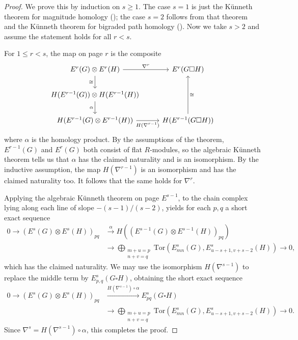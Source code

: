 \documentclass[a4paper, 11 pt, oneside, reqno]{amsart}
\numberwithin{lemma}{section}
\theoremstyle{definition}
\newcommand{\xto}{\xrightarrow}
\newcommand{\MPSS}{E}
\begin{document}
\begin{proof}
    We prove this by induction on \(s\geq 1\). The case \(s=1\) is just the K\"unneth theorem for magnitude homology (); the case \(s=2\) follows from that theorem and the K\"unneth theorem for bigraded path homology (). Now we take \(s > 2\) and assume the statement holds for all \(r < s\).
    
    For \(1 \leq r < s\), the map on page \(r\) is the composite
    \[
        \begin{tikzcd}
        [
        ar symbol/.style = {draw=none,"\textstyle#1" description,sloped},
        isomorphic/.style = {ar symbol={\cong}},
        ]
        \MPSS^r(G) \otimes \MPSS^r(H) \arrow[swap]{d}{\cong} \arrow{r}{\nabla^r} & \MPSS^r(G \square H)\\
        H(\MPSS^{r-1}(G)) \otimes H(\MPSS^{r-1}(H)) \arrow[swap]{d}{\alpha} \\
        H(\MPSS^{r-1}(G) \otimes \MPSS^{r-1}(H)) \arrow[swap]{r}{H(\nabla^{r-1})} & H(\MPSS^{r-1}(G \square H)) 
        \arrow[swap]{uu}{\cong}
        \end{tikzcd}
    \]
    where \(\alpha\) is the homology product. By the assumptions of the theorem, \(\MPSS^{r-1}(G)\) and \(\MPSS^r(G)\) both consist of flat \(R\)-modules, so the algebraic K\"unneth theorem tells us that \(\alpha\) has the claimed naturality and is an isomorphism. By the inductive assumption, the map \(H(\nabla^{r-1})\) is an isomorphism and has the claimed naturality too. It follows that the same holds for \(\nabla^r\).
    
    Applying the algebraic K\"unneth theorem on page \(E^{s-1}\), to the chain complex lying along each line of slope \(-(s-1) / (s-2)\), yields for each \(p,q\) a short exact sequence
    \begin{align*}
    0 \to \left( \MPSS^{s}(G) \otimes \MPSS^{s} (H)  \right)_{pq} & \xto{\alpha} H \left( (\MPSS^{s-1} (G) \otimes \MPSS^{s-1} (H) )_{pq} \right) \\
    &\to \bigoplus_{\substack{m+u=p \\ n+v = q}} \mathrm{Tor}(\MPSS^{s}_{mn}(G),\MPSS^{s}_{{u-s+1,v+s-2}}(H)) \to 0,
    \end{align*}
    which has the claimed naturality. We may use the isomorphism \(H(\nabla^{s-1})\) to replace the middle term by \(\MPSS_{p,q}^{s}(G \square H)\), obtaining the short exact sequence
    \begin{align*}
    0 \to \left( \MPSS^{s}(G) \otimes \MPSS^{s} (H)  \right)_{pq} & \xto{H(\nabla^{s-1}) \circ \alpha} \MPSS_{pq}^{s}(G \square H) \\
    &\to \bigoplus_{\substack{m+u=p \\ n+v = q}} \mathrm{Tor}(\MPSS^{s}_{{mn}}(G),\MPSS^{s}_{{u-s+1,v+s-2}}(H)) \to 0.
    \end{align*}
    Since \(\nabla^s = H(\nabla^{s-1}) \circ \alpha\), this completes the proof.
\end{proof}
\end{document}
